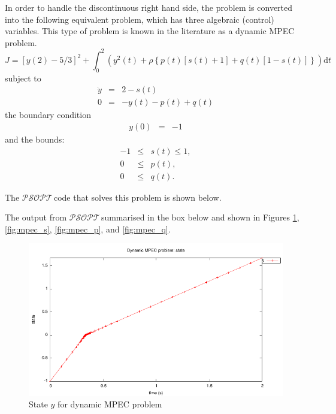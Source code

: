\documentclass[a4paper,11pt]{report}    %
\newcommand{\psopt}{$\mathcal{PSOPT}$\,}  %
\newenvironment{shadedframe}{%
  \def\FrameCommand{\fcolorbox{black}{shadecolor}}%
  \MakeFramed {\FrameRestore}}
{\endMakeFramed}
\begin{document}
In order to handle the discontinuous right hand side,  the problem is converted into the following equivalent
problem, which has three algebraic (control) variables. This type of problem is known in the literature as a dynamic MPEC problem.
\begin{equation}
  J = \left[ y(2)- 5/3\right]^2 + \int_0^2 \left( y^2(t) + \rho\left\{ p(t)[s(t)+1] +q(t)[1-s(t)] \right\} \right) \mathrm{d}t
\end{equation}
subject to 
\begin{equation}
  \begin{array}{lcl}
    \dot y & = & 2 - s(t) \\
     0 &=& -y(t) -p(t) + q(t)
  \end{array}
\end{equation}
the boundary condition
\begin{equation}
  \begin{array}{lcl}
    y(0) & = & -1 
  \end{array}
\end{equation}
and the bounds:
\begin{equation}
  \begin{array}{lcl}
    -1 &\le & s(t) \le  1, \\
     0 &\le & p(t), \\
     0 &\le & q(t).      
  \end{array}
\end{equation}

The \psopt code that solves this problem is shown below.  

\tiny
\begin{shadedframe}

\end{shadedframe}
\normalsize

The output from \psopt summarised in the box below and shown in Figures \ref{fig:mpec_state}, \ref{fig:mpec_s}, \ref{fig:mpec_p}, and \ref{fig:mpec_q}.

\begin{shadedframe}

\end{shadedframe}

\begin{figure}
  \centering 
  \includegraphics{../examples/mpec/y}
  \caption{State $y$ for dynamic MPEC problem}
 \label{fig:mpec_state}
\end{figure}
\end{document}
